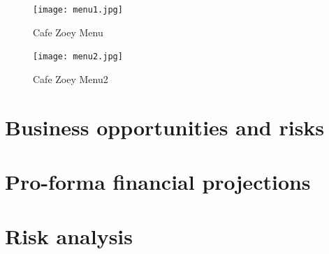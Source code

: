 \documentclass{article}
\begin{document}
\begin{figure}[h!]
	\caption{Cafe Zoey Menu}
	\centering
		\texttt{[image: menu1.jpg]}
\end{figure}


\begin{figure}[h!]
	\caption{Cafe Zoey Menu2}
	\centering
		\texttt{[image: menu2.jpg]}
\end{figure}


\section{Business opportunities and risks}
\section{Pro-forma financial projections}
\section{Risk analysis}
\end{document}

